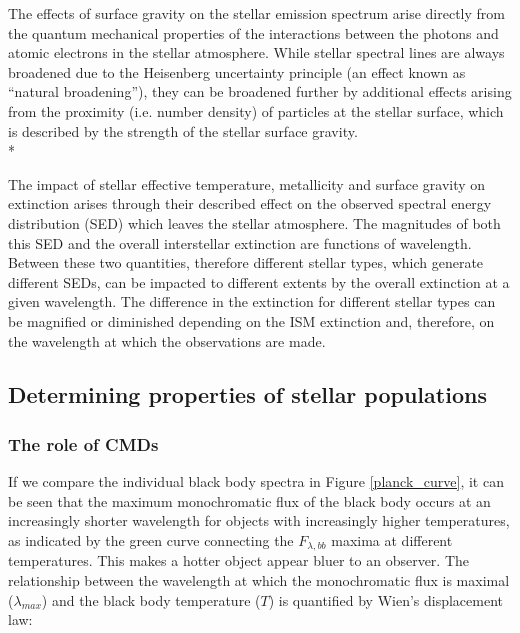 \documentclass[12pt, a4paper]{report}
\begin{document}

The effects of surface gravity on the stellar emission spectrum arise directly from the quantum mechanical properties of the interactions between the photons and atomic electrons in the stellar atmosphere. While stellar spectral lines are always broadened due to the Heisenberg uncertainty principle (an effect known as ``natural broadening''), they can be broadened further by additional effects arising from the proximity (i.e. number density) of particles at the stellar surface, which is described by the strength of the stellar surface gravity. \\*


The impact of stellar effective temperature, metallicity and surface gravity on extinction arises through their described effect on the observed spectral energy distribution (SED) which leaves the stellar atmosphere. The magnitudes of both this SED and the overall interstellar extinction are functions of wavelength. Between these two quantities, therefore different stellar types, which generate different SEDs, can be impacted to different extents by the overall extinction at a given wavelength. The difference in the extinction for different stellar types can be magnified or diminished depending on the ISM extinction and, therefore, on the wavelength at which the observations are made.

\subsection{Determining properties of stellar populations}
\subsubsection{The role of CMDs} \label{CMDs_intro}
If we compare the individual black body spectra in Figure \ref{planck_curve}, it can be seen that the maximum monochromatic flux of the black body occurs at an increasingly shorter wavelength for objects with increasingly higher temperatures, as indicated by the green curve connecting the $F_{\lambda,bb}$ maxima at different temperatures. This makes a hotter object appear bluer to an observer. The relationship between the wavelength at which the monochromatic flux is maximal ($\lambda_{max}$) and the black body temperature ($T$) is quantified by Wien's displacement law:
\end{document}
